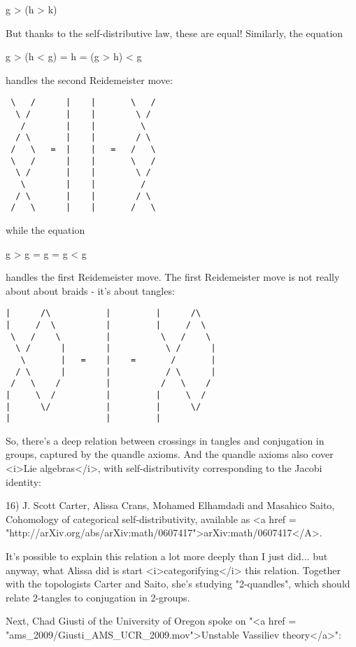 g > (h > k)

But thanks to the self-distributive law, these are equal!  Similarly,
the equation 

g > (h < g) = h = (g > h) < g

handles the second Reidemeister move:

\begin{verbatim}
 \   /      |    |       \   / 
  \ /       |    |        \ /
   /        |    |         \  
  / \       |    |        / \  
 /   \   =  |    |   =   /   \  
 \   /      |    |       \   /
  \ /       |    |        \ /
   \        |    |         / 
  / \       |    |        / \ 
 /   \      |    |       /   \ 
\end{verbatim}
    
while the equation 

g > g = g = g < g

handles the first Reidemeister move.  The first Reidemeister move is
not really about about braids - it's about tangles: 

\begin{verbatim}
|      /\           |         |      /\
|     /  \          |         |     /  \
 \   /    \         |          \   /    \
  \ /      |        |           \ /      |
   \       |   =    |    =       /       |
  / \      |        |           / \      |
 /   \    /         |          /   \    /
|     \  /          |         |     \  / 
|      \/           |         |      \/
|                   |         |    
\end{verbatim}
    

So, there's a deep relation between crossings in tangles and
conjugation in groups, captured by the quandle axioms.  And the
quandle axioms also cover <i>Lie algebras</i>, with self-distributivity
corresponding to the Jacobi identity:

16) J. Scott Carter, Alissa Crans, Mohamed Elhamdadi and Masahico
Saito, Cohomology of categorical self-distributivity, available
as <a href = "http://arXiv.org/abs/arXiv:math/0607417">arXiv:math/0607417</A>.

It's possible to explain this relation a lot more deeply than I just
did... but anyway, what Alissa did is start <i>categorifying</i> this
relation.  Together with the topologists Carter and Saito, she's
studying "2-quandles", which should relate 2-tangles to
conjugation in 2-groups.

Next, Chad Giusti of the University of Oregon spoke on "<a href =
"ams_2009/Giusti_AMS_UCR_2009.mov">Unstable Vassiliev
theory</a>":
 
